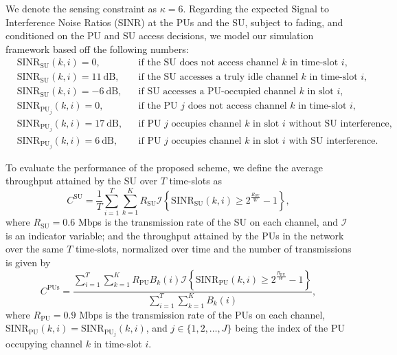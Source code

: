 \documentclass[12pt, draftcls, onecolumn]{IEEEtran}
\begin{document}
We denote the sensing constraint as $\kappa{=}6$. Regarding the expected Signal to Interference Noise Ratios (SINR) at the PUs and the SU, subject to fading, and conditioned on the PU and SU access decisions, we model our simulation framework based off the following numbers:
\begin{align*}
    &\text{SINR}_{\text{SU}}(k,i){=}0,&&\text{if the SU does not access channel $k$ in time-slot $i$,}\\
    &\text{SINR}_{\text{SU}}(k,i){=}11\ \text{dB},&&\text{if the SU accesses a truly idle channel $k$ in time-slot $i$,}\\
    &\text{SINR}_{\text{SU}}(k,i){=}{-}6\ \text{dB},&&\text{if SU accesses a PU-occupied channel $k$ in slot $i$,}\\
    &\text{SINR}_{\text{PU}_{j}}(k,i){=}0,&&\text{if the PU $j$ does not access channel $k$ in time-slot $i$,}\\
    &\text{SINR}_{\text{PU}_{j}}(k,i){=}17\ \text{dB},&&\text{if PU $j$ occupies channel $k$ in slot $i$ without SU interference,}\\
    &\text{SINR}_{\text{PU}_{j}}(k,i){=}6\ \text{dB},&&\text{if PU $j$ occupies channel $k$ in slot $i$ with SU interference.}
\end{align*}

To evaluate the performance of the proposed scheme, we define the average throughput attained by the SU over $T$ time-slots as
\begin{equation}\label{30}
    C^{\text{SU}}=\frac{1}{T}\sum_{i=1}^{T}\sum_{k=1}^{K}R_{\text{SU}}\mathcal{I}\left\{\text{SINR}_{\text{SU}}(k,i) \geq 2^{\frac{R_{\text{SU}}}{W}}-1\right\},
\end{equation}
where $R_{\text{SU}}{=}0.6$ Mbps is the transmission rate of the SU on each channel, and $\mathcal{I}$ is an indicator variable; and the throughput attained by the PUs in the network over the same $T$ time-slots, normalized over time and the number of transmissions is given by
\begin{equation}\label{31}
    C^{\text{PUs}}=\frac{\sum_{i=1}^{T}\sum_{k=1}^{K}R_{\text{PU}}B_{k}(i)\mathcal{I}\left\{\text{SINR}_{\text{PU}}(k,i) \geq 2^{\frac{R_{\text{PU}}}{W}}-1\right\}}{\sum_{i=1}^{T}\sum_{k=1}^{K}B_{k}(i)},
\end{equation}
where $R_{\text{PU}}{=}0.9$ Mbps is the transmission rate of the PUs on each channel, $\text{SINR}_{\text{PU}}(k,i)=\text{SINR}_{\text{PU}_{j}}(k,i)$, and $j{\in}\{1,2,\dots,J\}$ being the index of the PU occupying channel $k$ in time-slot $i$.
\end{document}
